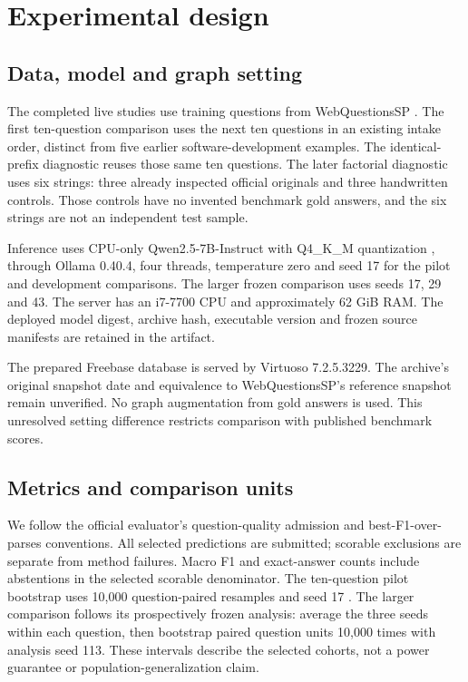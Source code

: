 \documentclass[10pt]{article}
\begin{document}
\section{Experimental design}

\subsection{Data, model and graph setting}

The completed live studies use training questions from WebQuestionsSP \cite{yih-etal-2016-value}. The first ten-question comparison uses the next ten questions in an existing intake order, distinct from five earlier software-development examples. The identical-prefix diagnostic reuses those same ten questions. The later factorial diagnostic uses six strings: three already inspected official originals and three handwritten controls. Those controls have no invented benchmark gold answers, and the six strings are not an independent test sample.\par

Inference uses CPU-only Qwen2.5-7B-Instruct with Q4\_K\_M quantization \cite{qwen2024}, through Ollama 0.40.4, four threads, temperature zero and seed 17 for the pilot and development comparisons. The larger frozen comparison uses seeds 17, 29 and 43. The server has an i7-7700 CPU and approximately 62 GiB RAM. The deployed model digest, archive hash, executable version and frozen source manifests are retained in the artifact.\par

The prepared Freebase database is served by Virtuoso 7.2.5.3229. The archive's original snapshot date and equivalence to WebQuestionsSP's reference snapshot remain unverified. No graph augmentation from gold answers is used. This unresolved setting difference restricts comparison with published benchmark scores.\par

\subsection{Metrics and comparison units}

We follow the official evaluator's question-quality admission and best-F1-over-parses conventions. All selected predictions are submitted; scorable exclusions are separate from method failures. Macro F1 and exact-answer counts include abstentions in the selected scorable denominator. The ten-question pilot bootstrap uses 10,000 question-paired resamples and seed 17 \cite{efron1979bootstrap}. The larger comparison follows its prospectively frozen analysis: average the three seeds within each question, then bootstrap paired question units 10,000 times with analysis seed 113. These intervals describe the selected cohorts, not a power guarantee or population-generalization claim.\par
\end{document}
